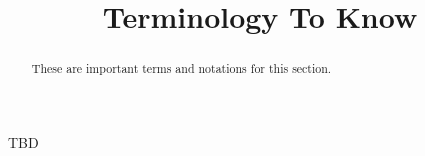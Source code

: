 \documentclass{ximeraXloud}
\title{Terminology To Know}
\begin{document}
\begin{abstract}
    These are important terms and notations for this section.
\end{abstract}
\maketitle

TBD

%
%
%
%
\end{document}
